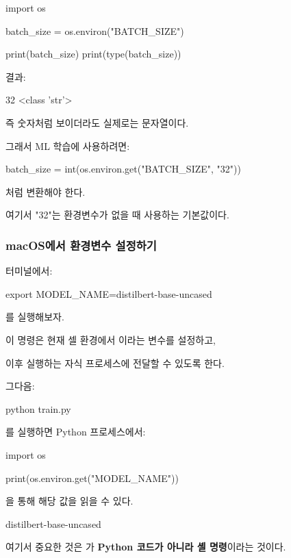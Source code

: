 \begin{dhkcode}
import os

batch_size = os.environ("BATCH_SIZE")

print(batch_size)
print(type(batch_size))
\end{dhkcode}

결과:

\begin{dhkzsh}
32
<class 'str'>
\end{dhkzsh}

즉 숫자처럼 보이더라도 실제로는 문자열이다.

그래서 ML 학습에 사용하려면:

\begin{dhkcode}
batch_size = int(os.environ.get("BATCH_SIZE", "32"))
\end{dhkcode}

처럼 변환해야 한다.

여기서 "32"는 환경변수가 없을 때 사용하는 기본값이다.

\subsubsection{macOS에서 환경변수 설정하기}

터미널에서:

\begin{dhkzsh}
export MODEL_NAME=distilbert-base-uncased
\end{dhkzsh}

를 실행해보자.

이 명령은 현재 셀 환경에서 이라는 변수를 설정하고,

이후 실행하는 자식 프로세스에 전달할 수 있도록 한다.

그다음:

\begin{dhkzsh}
python train.py
\end{dhkzsh}

를 실행하면 Python 프로세스에서:

\begin{dhkcode}
import os

print(os.environ.get("MODEL_NAME"))
\end{dhkcode}

을 통해 해당 값을 읽을 수 있다.

\begin{dhkzsh}
distilbert-base-uncased
\end{dhkzsh}

여기서 중요한 것은 가 \textbf{Python 코드가 아니라 셸 명령}이라는 것이다.

